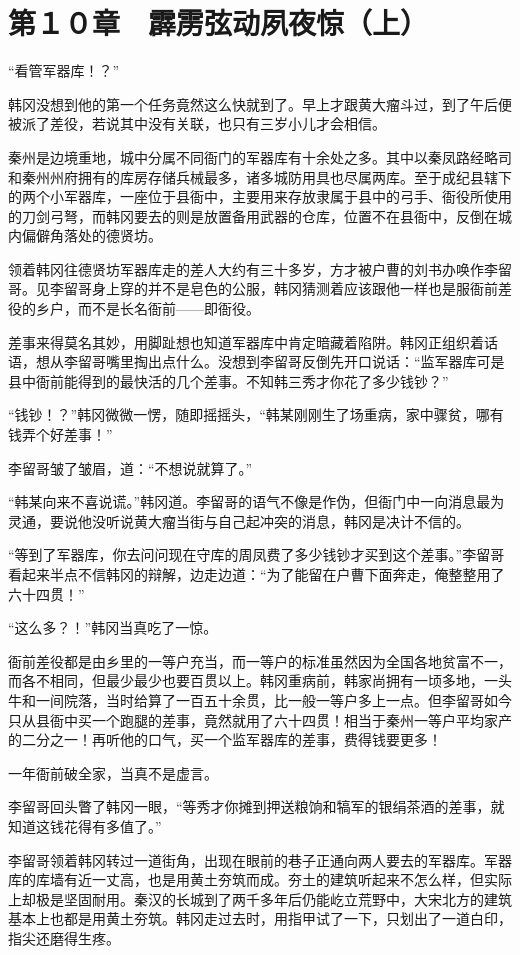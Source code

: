 \section{第１０章　霹雳弦动夙夜惊（上）}

“看管军器库！？”

韩冈没想到他的第一个任务竟然这么快就到了。早上才跟黄大瘤斗过，到了午后便被派了差役，若说其中没有关联，也只有三岁小儿才会相信。

秦州是边境重地，城中分属不同衙门的军器库有十余处之多。其中以秦凤路经略司和秦州州府拥有的库房存储兵械最多，诸多城防用具也尽属两库。至于成纪县辖下的两个小军器库，一座位于县衙中，主要用来存放隶属于县中的弓手、衙役所使用的刀剑弓弩，而韩冈要去的则是放置备用武器的仓库，位置不在县衙中，反倒在城内偏僻角落处的德贤坊。

领着韩冈往德贤坊军器库走的差人大约有三十多岁，方才被户曹的刘书办唤作李留哥。见李留哥身上穿的并不是皂色的公服，韩冈猜测着应该跟他一样也是服衙前差役的乡户，而不是长名衙前——即衙役。

差事来得莫名其妙，用脚趾想也知道军器库中肯定暗藏着陷阱。韩冈正组织着话语，想从李留哥嘴里掏出点什么。没想到李留哥反倒先开口说话：“监军器库可是县中衙前能得到的最快活的几个差事。不知韩三秀才你花了多少钱钞？”

“钱钞！？”韩冈微微一愣，随即摇摇头，“韩某刚刚生了场重病，家中骤贫，哪有钱弄个好差事！”

李留哥皱了皱眉，道：“不想说就算了。”

“韩某向来不喜说谎。”韩冈道。李留哥的语气不像是作伪，但衙门中一向消息最为灵通，要说他没听说黄大瘤当街与自己起冲突的消息，韩冈是决计不信的。

“等到了军器库，你去问问现在守库的周凤费了多少钱钞才买到这个差事。”李留哥看起来半点不信韩冈的辩解，边走边道：“为了能留在户曹下面奔走，俺整整用了六十四贯！”

“这么多？！”韩冈当真吃了一惊。

衙前差役都是由乡里的一等户充当，而一等户的标准虽然因为全国各地贫富不一，而各不相同，但最少最少也要百贯以上。韩冈重病前，韩家尚拥有一顷多地，一头牛和一间院落，当时给算了一百五十余贯，比一般一等户多上一点。但李留哥如今只从县衙中买一个跑腿的差事，竟然就用了六十四贯！相当于秦州一等户平均家产的二分之一！再听他的口气，买一个监军器库的差事，费得钱要更多！

一年衙前破全家，当真不是虚言。

李留哥回头瞥了韩冈一眼，“等秀才你摊到押送粮饷和犒军的银绢茶酒的差事，就知道这钱花得有多值了。”

李留哥领着韩冈转过一道街角，出现在眼前的巷子正通向两人要去的军器库。军器库的库墙有近一丈高，也是用黄土夯筑而成。夯土的建筑听起来不怎么样，但实际上却极是坚固耐用。秦汉的长城到了两千多年后仍能屹立荒野中，大宋北方的建筑基本上也都是用黄土夯筑。韩冈走过去时，用指甲试了一下，只划出了一道白印，指尖还磨得生疼。

